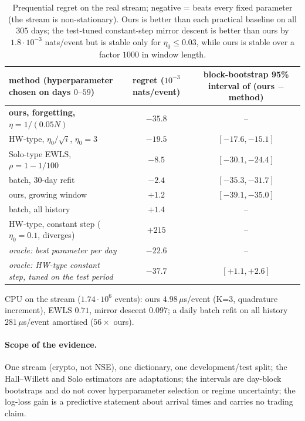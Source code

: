 \begin{table}[h]\centering\small
\begin{tabular}{@{}p{7.2cm}cc@{}}\toprule
method (hyperparameter chosen on days $0$--$59$) & regret ($10^{-3}$ nats/event) & block-bootstrap 95\% interval of (ours $-$ method)\\\midrule
\textbf{ours, forgetting, $\eta=1/(0.05N)$} & $-35.8$ & --\\
HW-type, $\eta_0/\sqrt i$, $\eta_0=3$ & $-19.5$ & $[-17.6,-15.1]$\\
Solo-type EWLS, $\rho=1-1/100$ & $-8.5$ & $[-30.1,-24.4]$\\
batch, 30-day refit & $-2.4$ & $[-35.3,-31.7]$\\
ours, growing window & $+1.2$ & $[-39.1,-35.0]$\\
batch, all history & $+1.4$ & --\\
HW-type, constant step ($\eta_0=0.1$, diverges) & $+215$ & --\\\midrule
\emph{oracle: best parameter per day} & $-22.6$ & --\\
\emph{oracle: HW-type constant step, tuned on the test period} & $-37.7$ & $[+1.1,+2.6]$\\\bottomrule
\end{tabular}
\caption{Prequential regret on the real stream; negative = beats every fixed parameter (the stream is non-stationary). Ours is better than each practical baseline on all $305$ days; the test-tuned constant-step mirror descent is better than ours by $1.8\cdot10^{-3}$ nats/event but is stable only for $\eta_0\le0.03$, while ours is stable over a factor $1000$ in window length.}\label{tab:real}
\end{table}
CPU on the stream ($1.74\cdot10^6$ events): ours $4.98\,\mu$s/event (K=3, quadrature increment), EWLS $0.71$, mirror descent $0.097$; a daily batch refit on all history $281\,\mu$s/event amortised ($56\times$ ours).

\paragraph{Scope of the evidence.} One stream (crypto, not NSE), one dictionary, one development/test split; the Hall--Willett and Solo estimators are adaptations; the intervals are day-block bootstraps and do not cover hyperparameter selection or regime uncertainty; the log-loss gain is a predictive statement about arrival times and carries no trading claim.
